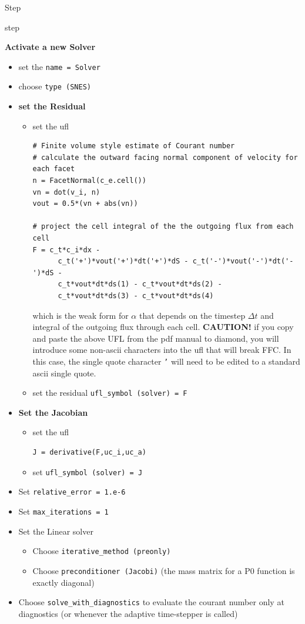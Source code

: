 \begin{steps}{Step}
\begin{steps}{step}
    \item \textbf{Activate a new Solver}
\begin{itemize}
      \item set the \texttt{name = Solver}
      \item choose \texttt{type (SNES)}
      \item \textbf{set the Residual}
        \begin{itemize}
        \item set the ufl 
\begin{lstlisting}[style=UFL]
# Finite volume style estimate of Courant number
# calculate the outward facing normal component of velocity for each facet
n = FacetNormal(c_e.cell())
vn = dot(v_i, n)
vout = 0.5*(vn + abs(vn))

# project the cell integral of the the outgoing flux from each cell
F = c_t*c_i*dx - 
      c_t('+')*vout('+')*dt('+')*dS - c_t('-')*vout('-')*dt('-')*dS - 
      c_t*vout*dt*ds(1) - c_t*vout*dt*ds(2) - 
      c_t*vout*dt*ds(3) - c_t*vout*dt*ds(4)
    \end{lstlisting}
which is the weak form for $\alpha$ that depends on the timestep
$\Delta t$ and integral of the outgoing flux through each cell. \textbf{CAUTION!}
 if you copy and paste the above UFL from the pdf manual to diamond,
 you will introduce some non-ascii characters into the ufl that will
 break FFC.  In this case,  the single quote character \texttt{'} will need to
 be edited to a standard ascii single quote.
\item set the residual \texttt{ufl\_symbol (solver) = F}
\end{itemize}
\item \textbf{Set the Jacobian}
\begin{itemize}
\item set the ufl 
\begin{lstlisting}[style=UFL]
J = derivative(F,uc_i,uc_a)
    \end{lstlisting}
\item set \texttt{ufl\_symbol (solver) = J}
        \end{itemize}
      \item Set \texttt{relative\_error = 1.e-6}
      \item Set \texttt{max\_iterations = 1}

      \item Set the Linear solver
        \begin{itemize}
        \item Choose \texttt{iterative\_method (preonly)}
        \item Choose \texttt{preconditioner (Jacobi)} (the mass matrix
          for a P0 function is exactly diagonal)
        \end{itemize}
      \item Choose \texttt{solve\_with\_diagnostics} to evaluate the
        courant number only at diagnostics (or whenever the adaptive
        time-stepper is called)
        \end{itemize}


\end{steps}
\end{steps}

